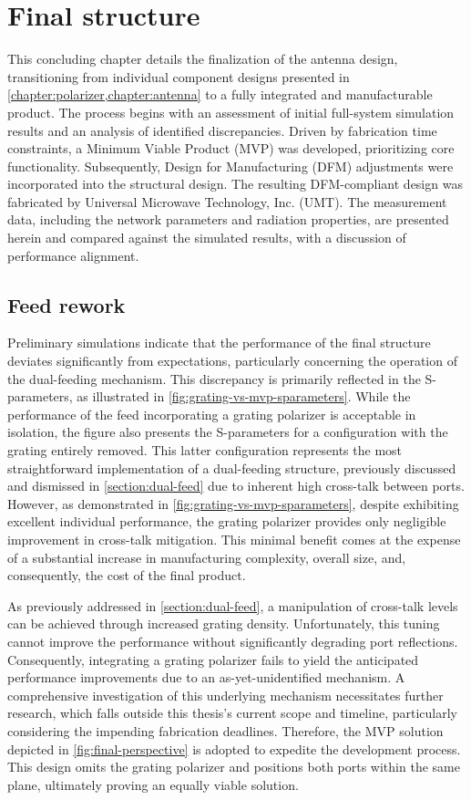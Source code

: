 \documentclass[14pt,a4paper]{ntust_report}
\begin{document}
\chapter{Final structure}
\label{chapter:final-structure}
This concluding chapter details the finalization of the antenna design, transitioning from individual component designs presented in \cref{chapter:polarizer,chapter:antenna} to a fully integrated and manufacturable product. The process begins with an assessment of initial full-system simulation results and an analysis of identified discrepancies. Driven by fabrication time constraints, a Minimum Viable Product (MVP) was developed, prioritizing core functionality. Subsequently, Design for Manufacturing (DFM) adjustments were incorporated into the structural design. The resulting DFM-compliant design was fabricated by Universal Microwave Technology, Inc. (UMT). The measurement data, including the network parameters and radiation properties, are presented herein and compared against the simulated results, with a discussion of performance alignment.

\section{Feed rework}
Preliminary simulations indicate that the performance of the final structure deviates significantly from expectations, particularly concerning the operation of the dual-feeding mechanism. This discrepancy is primarily reflected in the S-parameters, as illustrated in \cref{fig:grating-vs-mvp-sparameters}. While the performance of the feed incorporating a grating polarizer is acceptable in isolation, the figure also presents the S-parameters for a configuration with the grating entirely removed. This latter configuration represents the most straightforward implementation of a dual-feeding structure, previously discussed and dismissed in \cref{section:dual-feed} due to inherent high cross-talk between ports. However, as demonstrated in \cref{fig:grating-vs-mvp-sparameters}, despite exhibiting excellent individual performance, the grating polarizer provides only negligible improvement in cross-talk mitigation. This minimal benefit comes at the expense of a substantial increase in manufacturing complexity, overall size, and, consequently, the cost of the final product.

As previously addressed in \cref{section:dual-feed}, a manipulation of cross-talk levels can be achieved through increased grating density. Unfortunately, this tuning cannot improve the performance without significantly degrading port reflections. Consequently, integrating a grating polarizer fails to yield the anticipated performance improvements due to an as-yet-unidentified mechanism. A comprehensive investigation of this underlying mechanism necessitates further research, which falls outside this thesis's current scope and timeline, particularly considering the impending fabrication deadlines. Therefore, the MVP solution depicted in \cref{fig:final-perspective} is adopted to expedite the development process. This design omits the grating polarizer and positions both ports within the same plane, ultimately proving an equally viable solution.
\end{document}
